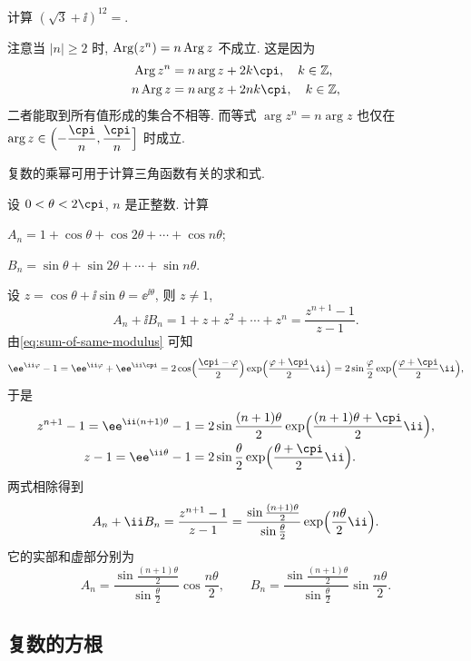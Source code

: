 \begin{exercise}
  计算 $(\sqrt3+\ii)^{12}=$\fillblank{}.
\end{exercise}

注意当 $|n|\ge 2$ 时, \alert{$\operatorname{Arg}(z^n)=n\operatorname{Arg} z$ 不成立}.
这是因为
\begin{align*}
  \Arg z^n&=n\arg z+2k\cpi,\quad k\in\BZ,\\
  n\Arg z&=n\arg z+2nk\cpi,\quad k\in\BZ,
\end{align*}
二者能取到所有值形成的集合不相等.
而等式 $\arg z^n=n\arg z$ 也仅在 $\arg z\in\Bigl(-\dfrac{\cpi}n,\dfrac\cpi n\Bigr]$ 时成立.

复数的乘幂可用于计算三角函数有关的求和式.

\begin{example}
  设 $0<\theta<2\cpi$, $n$ 是正整数. 计算
  \begin{subexample}
    \item $A_n=1+\cos\theta+\cos{2\theta}+\cdots+\cos{n\theta}$;
    \item $B_n=\sin\theta+\sin{2\theta}+\cdots+\sin{n\theta}$.
  \end{subexample}
\end{example}

\begin{solution}
  设 $z=\cos\theta+\ii\sin\theta=\ee^{\ii\theta}$, 则 $z\neq 1$,
  \[
    A_n+\ii B_n=1+z+z^2+\cdots+z^n=\frac{z^{n+1}-1}{z-1}.
  \]
  由\eqref{eq:sum-of-same-modulus} 可知
  \[
     \ee^{\ii\varphi}-1
    =\ee^{\ii\varphi}+\ee^{\ii\cpi}
    =2\cos\Bigl(\frac{\cpi-\varphi}2\Bigr)\exp\Bigl(\frac{\varphi+\cpi}2\ii\Bigr)
    =2\sin\frac\varphi2\exp\Bigl(\frac{\varphi+\cpi}2\ii\Bigr),
  \]
  于是
  \begin{align*}
     z^{n+1}-1
    =\ee^{\ii(n+1)\theta}-1&
    =2\sin{\frac{(n+1)\theta}2}\exp\Bigl(\frac{(n+1)\theta+\cpi}2\ii\Bigr),\\
     z-1
    =\ee^{\ii\theta}-1&
    =2\sin{\frac\theta2}\exp\Bigl(\frac{\theta+\cpi}2\ii\Bigr).
  \end{align*}
  两式相除得到
  \[
     A_n+\ii B_n
    =\frac{z^{n+1}-1}{z-1}
    =\frac{\sin\frac{(n+1)\theta}2}{\sin\frac\theta2}\exp\Bigl(\frac{n\theta}2\ii\Bigr).
  \]
  它的实部和虚部分别为
  \[
     A_n
    =\frac{\sin\frac{(n+1)\theta}2}{\sin\frac\theta2}\cos\frac{n\theta}2,\qquad
    B_n
     =\frac{\sin\frac{(n+1)\theta}2}{\sin\frac\theta2}\sin\frac{n\theta}2.
  \]
\end{solution}


\subsection{复数的方根}

